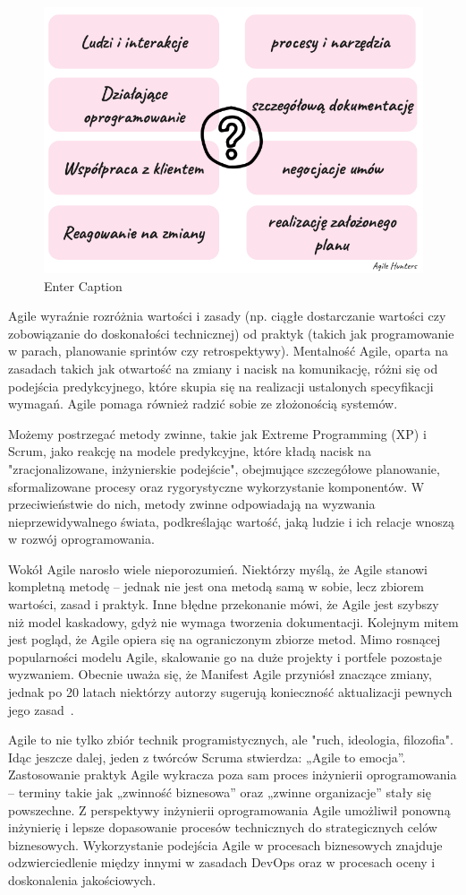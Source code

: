 \begin{figure}
    \centering
    \includegraphics[width=0.5\linewidth]{img/agile.png}
    \caption{Enter Caption}
\end{figure}

Agile wyraźnie rozróżnia wartości i zasady (np. ciągłe dostarczanie wartości czy zobowiązanie do doskonałości technicznej) od praktyk (takich jak programowanie w parach, planowanie sprintów czy retrospektywy). 
Mentalność Agile, oparta na zasadach takich jak otwartość na zmiany i nacisk na komunikację, różni się od podejścia predykcyjnego, które skupia się na realizacji ustalonych specyfikacji wymagań. Agile pomaga również radzić sobie ze złożonością systemów.\autocite{swebok}

Możemy postrzegać metody zwinne, takie jak Extreme Programming (XP) i Scrum, jako reakcję na modele predykcyjne, które kładą nacisk na "zracjonalizowane, inżynierskie podejście"\autocite{dyba2000}, obejmujące szczegółowe planowanie, sformalizowane procesy oraz rygorystyczne wykorzystanie komponentów.\autocite{boehm2002} W przeciwieństwie do nich, metody zwinne odpowiadają na wyzwania nieprzewidywalnego świata, podkreślając wartość, jaką ludzie i ich relacje wnoszą w rozwój oprogramowania.\autocite{dyba2009we}\autocite{nerur2007}

Wokół Agile narosło wiele nieporozumień. Niektórzy myślą, że Agile stanowi kompletną metodę – jednak nie jest ona metodą samą w sobie, lecz zbiorem wartości, zasad i praktyk. Inne błędne przekonanie mówi, że Agile jest szybszy niż model kaskadowy, gdyż nie wymaga tworzenia dokumentacji. Kolejnym mitem jest pogląd, że Agile opiera się na ograniczonym zbiorze metod. 
Mimo rosnącej popularności modelu Agile, skalowanie go na duże projekty i portfele pozostaje wyzwaniem. Obecnie uważa się, że Manifest Agile przyniósł znaczące zmiany, jednak po 20 latach niektórzy autorzy sugerują konieczność aktualizacji pewnych jego zasad~\cite{swebok}.

Agile to nie tylko zbiór technik programistycznych, ale "ruch, ideologia, filozofia". Idąc jeszcze dalej, jeden z twórców Scruma stwierdza: „Agile to emocja”.\autocite{meyer2014agile} Zastosowanie praktyk Agile wykracza poza sam proces inżynierii oprogramowania – terminy takie jak „zwinność biznesowa” oraz „zwinne organizacje” stały się powszechne. Z perspektywy inżynierii oprogramowania Agile umożliwił ponowną inżynierię i lepsze dopasowanie procesów technicznych do strategicznych celów biznesowych. Wykorzystanie podejścia Agile w procesach biznesowych znajduje odzwierciedlenie między innymi w zasadach DevOps oraz w procesach oceny i doskonalenia jakościowych.\autocite{swebok}

